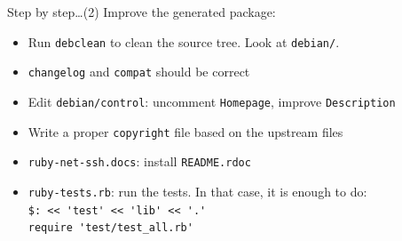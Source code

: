 \documentclass[10pt,final]{beamer}
\begin{document}
\begin{frame}[fragile=singleslide]{Step by step\ldots (2)}
Improve the generated package:
\begin{itemize}
	\item Run \texttt{debclean} to clean the source tree. Look at \texttt{debian/}.
		\hbr
	\item \texttt{changelog} and \texttt{compat} should be correct
		\hbr
	\item Edit \texttt{debian/control}: uncomment \texttt{Homepage}, improve \texttt{Description}
		\hbr
	\item Write a proper \texttt{copyright} file based on the upstream files
		\hbr
	\item \texttt{ruby-net-ssh.docs}: install \texttt{README.rdoc}
		\hbr
	\item \texttt{ruby-tests.rb}: run the tests. In that case, it is enough to do:\\
		\verb+$: << 'test' << 'lib' << '.'+\\
		\verb+require 'test/test_all.rb'+
\end{itemize}
\end{frame}
\end{document}
